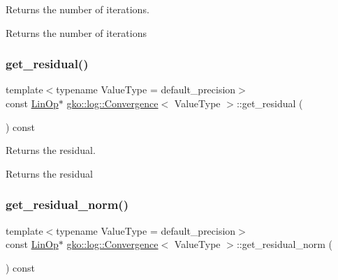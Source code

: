 Returns the number of iterations. 

\begin{DoxyReturn}{Returns}
the number of iterations 
\end{DoxyReturn}
\mbox{\label{classgko_1_1log_1_1Convergence_a6595e7edae4cb080943493252b6d77e9}} 
\subsubsection{\texorpdfstring{get\+\_\+residual()}{get\_residual()}}
{\footnotesize\ttfamily template$<$typename Value\+Type  = default\+\_\+precision$>$ \\
const \hyperlink{classgko_1_1LinOp}{Lin\+Op}$\ast$ \hyperlink{classgko_1_1log_1_1Convergence}{gko\+::log\+::\+Convergence}$<$ Value\+Type $>$\+::get\+\_\+residual (\begin{DoxyParamCaption}{ }\end{DoxyParamCaption}) const\hspace{0.3cm}{\ttfamily [noexcept]}}



Returns the residual. 

\begin{DoxyReturn}{Returns}
the residual 
\end{DoxyReturn}
\mbox{\label{classgko_1_1log_1_1Convergence_a68297edb94aee77f6125c4b823f4503c}} 
\subsubsection{\texorpdfstring{get\+\_\+residual\+\_\+norm()}{get\_residual\_norm()}}
{\footnotesize\ttfamily template$<$typename Value\+Type  = default\+\_\+precision$>$ \\
const \hyperlink{classgko_1_1LinOp}{Lin\+Op}$\ast$ \hyperlink{classgko_1_1log_1_1Convergence}{gko\+::log\+::\+Convergence}$<$ Value\+Type $>$\+::get\+\_\+residual\+\_\+norm (\begin{DoxyParamCaption}{ }\end{DoxyParamCaption}) const\hspace{0.3cm}{\ttfamily [noexcept]}}



